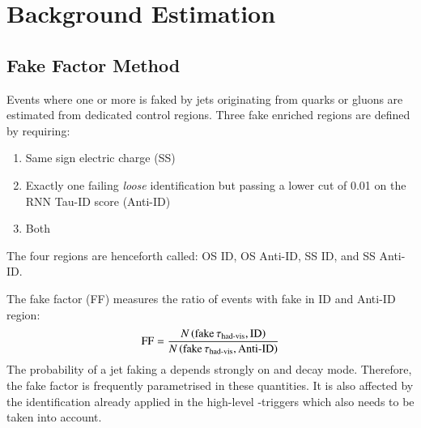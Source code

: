 \section{Background Estimation}










\subsection{Fake Factor Method}

Events where one or more \tauhadvis is faked by jets originating from quarks or
gluons are estimated from dedicated control regions. Three fake enriched regions
are defined by requiring:
\begin{enumerate}
\item Same sign electric charge \tauhadvis (SS)
\item Exactly one \tauhadvis failing \textit{loose} identification but passing a
  lower cut of 0.01 on the RNN Tau-ID score (Anti-ID)
\item Both
\end{enumerate}
The four regions are henceforth called: OS ID, OS Anti-ID, SS ID, and SS
Anti-ID.

The fake factor (FF) measures the ratio of events with fake \tauhadvis in ID and
Anti-ID region:
\begin{align*}
  \text{FF} = \frac{N\left( \text{fake} \, \tau_{\text{had-vis}}, \text{ID} \right)}{N\left( \text{fake} \, \tau_{\text{had-vis}}, \text{Anti-ID} \right)}
\end{align*}
The probability of a jet faking a \tauhadvis depends strongly on \tauhadvis \pT
and decay mode. Therefore, the fake factor is frequently parametrised in these
quantities. It is also affected by the \tauhadvis identification already applied
in the high-level \tauhadvis-triggers which also needs to be taken into account.

